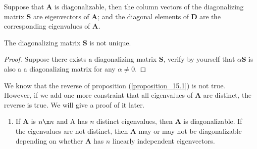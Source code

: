 \begin{proposition}\label{Pro:7:5}
Suppose that $\bm A$ is diagonalizable, then the column vectors of the diagonalizing matrix $\bm S$
are eigenvectors of $\bm A$; and the diagonal elements of $\bm D$ are the corresponding
eigenvalues of $\bm A$.
\end{proposition}
\begin{proposition}
The diagonalizing matrix $\bm S$ is not unique.
\end{proposition}
\begin{proof}
Suppose there exists a diagonalizing matrix $\bm S$, verify by yourself that $\alpha\bm S$ is also a a diagonalizing matrix for any $\alpha\ne0$.
\end{proof}





\begin{remark}
We know that the reverse of proposition (\ref{proposition_15.1}) is not true. However, if we add one more constraint that all eigenvalues of $\bm A$ are distinct, the reverse is true. We will give a proof of it later.
\begin{enumerate}
\item
If $\bm A$ is $n\x n$ and A has $n$ distinct eigenvalues, then $\bm A$ is diagonalizable. If the
eigenvalues are not distinct, then $\bm A$ may or may not be diagonalizable depending
on whether $\bm A$ has $n$ linearly independent eigenvectors.
\end{enumerate}
\end{remark}

